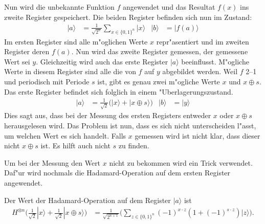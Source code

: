 \begin{refsection}
Nun wird die unbekannte Funktion $f$ angewendet und das Resultat $f(x)$ ins
zweite Register gespeichert. Die beiden Register befinden sich nun im Zustand:
\begin{align*}
  |a\rangle &= \frac{1}{\sqrt{2^n}} \sum_{x\in\{0,1\}^n} {|x\rangle} &
  |b\rangle &= |f(a)\rangle
\end{align*}
Im ersten Register sind alle m"oglichen Werte $x$ repr"asentiert und im zweiten
Register deren $f(a)$. Nun wird das zweite Register gemessen, der gemessene Wert
sei $y$. 
Gleichzeitig wird auch das erste Register $|a\rangle$ beeinflusst.
M"ogliche Werte in diesem Register sind alle die von $f$ auf $y$ abgebildet
werden. Weil $f$ 2--1 und periodisch mit Periode $s$ ist, gibt es genau zwei
m"ogliche Werte $x$ und $x \oplus s$. Das erste Register befindet sich folglich
in einem "Uberlagerungszustand. 
\begin{align*}
  |a\rangle &= \frac{1}{\sqrt{2}} \bigl( |x\rangle + |x \oplus s \rangle \bigr)
  &
  |b\rangle &= |y\rangle
\end{align*}
Dies sagt aus, dass bei der Messung des ersten Registers entweder $x$ oder $x
\oplus s$ herausgelesen wird. Das Problem ist nun, dass es sich nicht
unterscheiden l"asst, um welchen Wert es sich handelt.
Falls $x$ gemessen wird ist nicht klar, dass dieser nicht $x \oplus s$ ist. 
Es hilft auch nicht $s$ zu finden.

Um bei der Messung den Wert $x$ nicht zu bekommen wird ein Trick verwendet.
Daf"ur wird nochmals die Hadamard-Operation auf dem ersten Register angewendet.
\begin{hilfssatz}
  Der Wert der Hadamard-Operation auf dem Register $|a\rangle$ ist
  \begin{align}
    H^{ \otimes n } \biggl( 
                     \frac{1}{\sqrt{2}} |x\rangle + 
                     \frac{1}{\sqrt{2}} |x \oplus s\rangle 
                     \biggr)
    &= \frac1{\sqrt{2^{n + 1}}}
       \biggl( 
          \sum_{z \in \{0,1\}^n}  { (-1)^{x \cdot z} ( 1 + (-1)^{ s \cdot z}) |z\rangle } 
       \biggr).
  \label{simon:smalz}
\end{align}
\end{hilfssatz}


\end{refsection}
